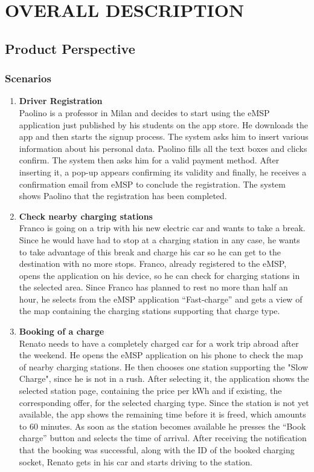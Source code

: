 \chapter{OVERALL DESCRIPTION}
\label{ch:overallDescription}%

\section{Product Perspective}
\label{sec:productPerspective}

\subsection{Scenarios} %
\label{subsec:scenarios}
\begin{enumerate}
\item \textbf{Driver Registration}\\
Paolino is a professor in Milan and decides to start using the eMSP application just published by his students on the app store.
He downloads the app and then starts the signup process. The system asks him to insert various information about his personal data. Paolino fills all the text boxes and clicks confirm. The system then asks him for a valid payment method. After inserting it, a pop-up appears confirming its validity and finally, he receives a confirmation email from eMSP to conclude the registration. The system shows Paolino that the registration has been completed.
\item \textbf{Check nearby charging stations}\\
Franco is going on a trip with his new electric car and wants to take a break. Since he would have had to stop at a charging station in any case, he wants to take advantage of this break and charge his car so he can get to the destination with no more stops.
Franco, already registered to the eMSP, opens the application on his device, so he can check for charging stations in the selected area. 
Since Franco has planned to rest no more than half an hour, he selects from the eMSP application “Fast-charge” and gets a view of the map containing the charging stations supporting that charge type.
\item \textbf{Booking of a charge}\\
Renato needs to have a completely charged car for a work trip abroad after the weekend. He opens the eMSP application on his phone to check the map of nearby charging stations. He then chooses one station supporting the "Slow Charge", since he is not in a rush. After selecting it, the application shows the selected station page, containing the price per kWh and if existing, the corresponding offer, for the selected charging type. Since the station is not yet available, the app shows the remaining time before it is freed, which amounts to 60 minutes. As soon as the station becomes available he presses the “Book charge” button and selects the time of arrival. After receiving the notification that the booking was successful, along with the ID of the booked charging socket, Renato gets in his car and starts driving to the station.

\end{enumerate}
